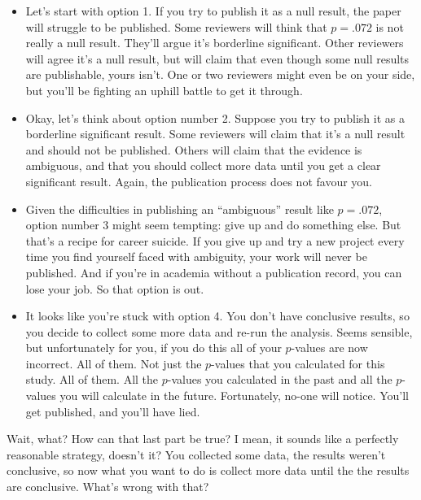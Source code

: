 \documentclass[
  a4paper,
]{book}
\begin{document}
\begin{itemize}
\item
  Let's start with option 1. If you try to publish it as a null result,
  the paper will struggle to be published. Some reviewers will think
  that \(p = .072\) is not really a null result. They'll argue it's
  borderline significant. Other reviewers will agree it's a null result,
  but will claim that even though some null results are publishable,
  yours isn't. One or two reviewers might even be on your side, but
  you'll be fighting an uphill battle to get it through.
\item
  Okay, let's think about option number 2. Suppose you try to publish it
  as a borderline significant result. Some reviewers will claim that
  it's a null result and should not be published. Others will claim that
  the evidence is ambiguous, and that you should collect more data until
  you get a clear significant result. Again, the publication process
  does not favour you.
\item
  Given the difficulties in publishing an ``ambiguous'' result like
  \(p = .072\), option number 3 might seem tempting: give up and do
  something else. But that's a recipe for career suicide. If you give up
  and try a new project every time you find yourself faced with
  ambiguity, your work will never be published. And if you're in
  academia without a publication record, you can lose your job. So that
  option is out.
\item
  It looks like you're stuck with option 4. You don't have conclusive
  results, so you decide to collect some more data and re-run the
  analysis. Seems sensible, but unfortunately for you, if you do this
  all of your \(p\)-values are now incorrect. All of them. Not just the
  \(p\)-values that you calculated for this study. All of them. All the
  \(p\)-values you calculated in the past and all the \(p\)-values you
  will calculate in the future. Fortunately, no-one will notice. You'll
  get published, and you'll have lied.
\end{itemize}

Wait, what? How can that last part be true? I mean, it sounds like a
perfectly reasonable strategy, doesn't it? You collected some data, the
results weren't conclusive, so now what you want to do is collect more
data until the the results are conclusive. What's wrong with that?
\end{document}
